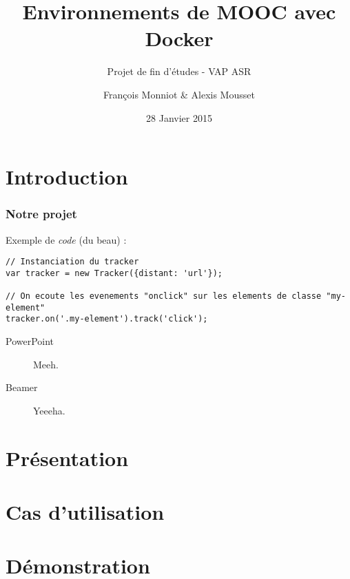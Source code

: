 \documentclass[10pt, compress]{beamer}
\title{Environnements de MOOC avec Docker}
\subtitle{Projet de fin d'études - VAP ASR}
\date{28 Janvier 2015}
\author{François Monniot \& Alexis Mousset}
\institute{Télécom SudParis}
\begin{document}
\maketitle

\section{Introduction}

\begin{frame}[fragile]
  \frametitle{Notre projet}

  Exemple de \emph{code} (du \alert{beau}) :

  \begin{verbatim}
// Instanciation du tracker
var tracker = new Tracker({distant: 'url'});

// On ecoute les evenements "onclick" sur les elements de classe "my-element"
tracker.on('.my-element').track('click');
  \end{verbatim}
  \begin{description}
    \item[PowerPoint] Meeh.
    \item[Beamer] Yeeeha.
  \end{description}
\end{frame}

\section{Présentation}

\section{Cas d'utilisation}

\section{Démonstration}

\end{document}
